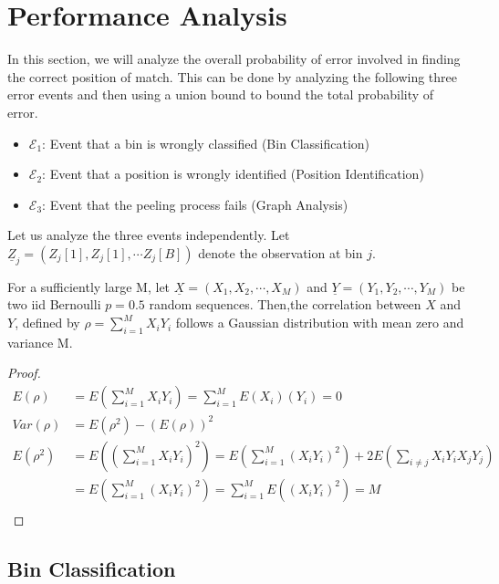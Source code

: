 \section{Performance Analysis}
In this section, we will analyze the overall probability of error involved in finding the correct position of match. This can be done by analyzing the following three error events and then using a union bound to bound the total probability of error.

\begin{itemize}
	\item $\mathcal{E}_1$: Event that a bin is wrongly classified  (Bin Classification)
	\item $\mathcal{E}_2$: Event that a position is wrongly identified  (Position Identification)
	\item $\mathcal{E}_3$: Event that the peeling process fails (Graph Analysis)
\end{itemize}

Let us analyze the three events independently. Let $\underline{Z}_{j} = (Z_{j}[1], Z_{j}[1], \cdots Z_{j}[B])$ denote the observation at bin $j$. 

\begin{lemma} \label{lem1}For a sufficiently large M, let $\underline{X}= (X_1, X_2, \cdots, X_M)$ and $\underline{Y}= (Y_1, Y_2, \cdots, Y_M)$ be two iid Bernoulli $p=0.5$ random sequences. Then,the correlation between $X$ and $Y$, defined by $\rho = \sum_{i=1}^{M} X_iY_i$ follows a Gaussian distribution with mean zero and variance M.
\end{lemma}

\begin{proof}
	\[
	\begin{array}{ll}
	E(\rho) &= E (\sum_{i=1}^{M} X_iY_i) =  \sum_{i=1}^{M} E (X_i)(Y_i) = 0  \\
	Var(\rho) &= E(\rho^2)-(E(\rho))^2 \\
	E(\rho^2) &= E ((\sum_{i=1}^{M} X_iY_i)^2) = E(\sum_{i=1}^{M} (X_iY_i)^2) + 2E(\sum_{i \neq j}X_iY_iX_jY_j) \\
	&= E(\sum_{i=1}^{M} (X_iY_i)^2) = \sum_{i=1}^{M} E( (X_iY_i)^2) = M \\
	\end{array}
	\]
\end{proof}


\subsection{Bin Classification}
 
